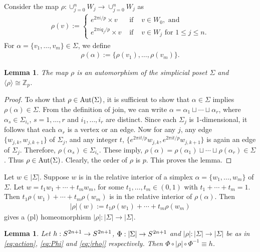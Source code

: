 \documentclass[12pt]{article}
\theoremstyle{theorem}
\newtheorem{lemma}[theorem]{Lemma}
\theoremstyle{definition}
\begin{document}
Consider the map $\rho: \cup_{j=0}^nW_j \to\cup_{j=0}^nW_j$ as 
\begin{align*}
\rho(v) := \left\{\begin{array}{lcl} 
e^{2\pi i/p}\times v & \mbox{ if } & v\in W_0,  \mbox{ and} \\
 e^{2\pi iq_j/p}\times v & \mbox{ if } & v\in W_j \mbox{ for } 1\leq j\leq n. 
 \end{array}
 \right.
 \end{align*}
For $\alpha = \{v_1, \dots, v_m\}\in \Sigma$, we define 
\begin{align}\label{action}
\rho(\alpha) := \{\rho(v_1), \dots, \rho(v_m)\}. 
\end{align}

\begin{lemma}\label{lem:action}
The map $\rho$ is an automorphism of the simplicial poset $\Sigma$ and $\langle\rho\rangle \cong \mathbb{Z}_p$.
\end{lemma}

\begin{proof}
To show that $\rho\in {\rm Aut}(\Sigma)$, it is sufficient to show that $\alpha\in \Sigma$ implies $\rho(\alpha)\in \Sigma$. From the definition of join, we can write  $\alpha = \alpha_1\sqcup\cdots \sqcup \alpha_r$, where $\alpha_s\in \Sigma_{i_s}$, $s=1, \dots, r$ and $i_1, \dots, i_r$ are distinct. Since each $\Sigma_j$ is 1-dimensional, it follows that each $\alpha_r$ is a vertex or an edge. Now for any $j$, any edge $\{w_{j, k}, w_{j, k+1}\}$ of $\Sigma_j$, and any integer $t$, $\{e^{2\pi it/p}w_{j, k}, e^{2\pi it/p}w_{j, k+1}\}$ is again an edge of $\Sigma_j$. Therefore, $\rho(\alpha_{s})\in \Sigma_{i_s}$. These imply, $\rho(\alpha) = \rho(\alpha_1)\sqcup\cdots\sqcup\rho(\alpha_r) \in \Sigma$. Thus $\rho\in {\rm Aut}(\Sigma)$. Clearly, the order of $\rho$ is $p$. This proves the lemma. 
\end{proof}

Let $w\in |\Sigma|$. Suppose $w$ is in the relative interior of a simplex $\alpha= \{w_1, \dots, w_m\}$ of $\Sigma$. Let $w = t_1w_1+\cdots + t_mw_m$, for some $t_1, \dots, t_m\in (0, 1)$ with $t_1+\cdots+t_m=1$. Then $t_1\rho(w_1)+ \cdots + t_m\rho(w_m)$ is in the relative interior of $\rho(\alpha)$. Then 
\begin{align}\label{eq:|rho|}
|\rho|(w) := t_1\rho(w_1)+ \cdots + t_m\rho(w_m)  
\end{align}
gives a (pl) homeomorphism $|\rho| : |\Sigma| \to |\Sigma|$. 


\begin{lemma}\label{lem:equality}
Let $h: S^{\hspace{.2mm}2n+1}  \to S^{\hspace{.2mm}2n+1} $,  $\Phi: |\Sigma| \to S^{\hspace{.2mm}2n+1}$ and $|\rho|: |\Sigma| \to |\Sigma|$ be as in \eqref{eq:action},  \eqref{eq:Phi} and \eqref{eq:|rho|} respectively. Then $\Phi\circ|\rho|\circ\Phi^{-1}\equiv h$.
\end{lemma}
\end{document}
